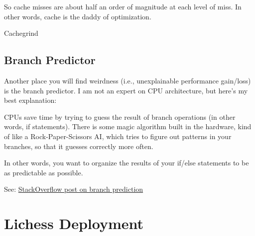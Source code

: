 \documentclass[letterpaper,11pt]{article}
\begin{document}
So cache misses are about half an order of magnitude at each level of miss. In other words, cache is the 
daddy of optimization.

Cachegrind

\subsection{Branch Predictor}

Another place you will find weirdness (i.e., unexplainable performance gain/loss) is the branch predictor. I am not an 
expert on CPU architecture, but here's my best explanation:

CPUs save time by trying to guess the result of branch operations (in other words, if statements). 
There is some magic algorithm built in the hardware, kind of like a Rock-Paper-Scissors AI, 
which tries to figure out patterns in your branches, so that it guesses correctly more often.

In other words, you want to organize the results of your if/else statements to be as 
predictable as possible.

See: \href{https://stackoverflow.com/questions/11227809/why-is-processing-a-sorted-array-faster-than-processing-an-unsorted-array}{StackOverflow post on branch prediction}

\section{Lichess Deployment}
\end{document}
